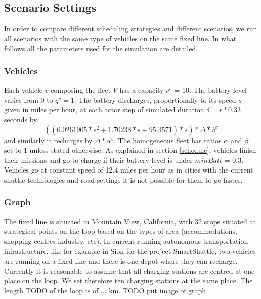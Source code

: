 \documentclass[12pt,a4paper]{article}
\begin{document}
\begin{table}
\caption{Simulation framework's parameters used}
\label{table:simparametersused}
\end{table}

\subsection{Scenario Settings}
In order to compare different scheduling strategies and different scenarios, we run all scenarios with the same type of vehicles on the same fixed line. In what follows all the parameters used for the simulation are detailed.
\subsubsection{Vehicles}\label{vparam}
Each vehicle $v$ composing the fleet $V$ has a capacity $c^{v}$ = 10. The battery level varies from 0 to $q^{v} = 1$. The battery discharges, proportionally to its speed $s$ given in miles per hour, at each actor step of simulated duration $\delta = r * 0.33$ seconds by:
$$((0.0261905 * s^{2} + 1.70238 * s + 95.3571) * s) * \Delta * \beta^{v}$$
and similarly it recharges by $ \Delta * \alpha^{v}$.
The homogeneous fleet has ratios $\alpha$ and $\beta$ set to 1 unless stated otherwise. As explained in section \ref{schedule}, vehicles finish their missions and go to charge if their battery level is under $minBatt$ = 0.3. Vehicles go at constant speed of 12.4 miles per hour as in cities with the current shuttle technologies and road settings it is not possible for them to go faster.
\subsubsection{Graph}
The fixed line is situated in Mountain View, California, with 32 stops situated at strategical points on the loop based on the types of area (accommodations, shopping centres industry, etc). In current running autonomous transportation infrastructure, like for example in Sion for the project SmartShuttle, two vehicles are running on a fixed line and there is one depot where they can recharge. Currently it is reasonable to assume that all charging stations are centred at one place on the loop. We set therefore ten charging stations at the same place. The length TODO of the loop is of ... km.  
TODO put image of graph
\end{document}
